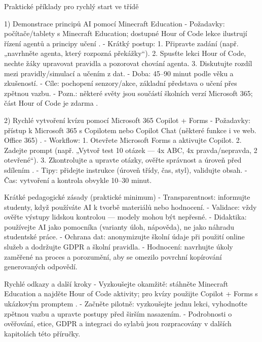 \documentclass{report}%
\begin{document}
Praktické příklady pro rychlý start ve třídě

1) Demonstrace principů AI pomocí Minecraft Education
- Požadavky: počítače/tablety s Minecraft Education; dostupné Hour of Code lekce ilustrují řízení agentů a principy učení \cite{kb_ai_101_tipu_pdf_04e4a115_page_15_2}.
- Krátký postup:
  1. Připravte zadání (např. „navrhněte agenta, který rozpozná překážky“).
  2. Spusťte lekci Hour of Code, nechte žáky upravovat pravidla a pozorovat chování agenta.
  3. Diskutujte rozdíl mezi pravidly/simulací a učením z dat.
- Doba: 45–90 minut podle věku a zkušeností.
- Cíle: pochopení senzory/akce, základní představa o učení přes zpětnou vazbu.
- Pozn.: některé světy jsou součástí školních verzí Microsoft 365; část Hour of Code je zdarma \cite{kb_ai_101_tipu_pdf_04e4a115_page_15_2}.

2) Rychlé vytvoření kvízu pomocí Microsoft 365 Copilot + Forms
- Požadavky: přístup k Microsoft 365 s Copilotem nebo Copilot Chat (některé funkce i ve web. Office 365) \cite{kb_ai_101_tipu_pdf_04e4a115_page_3_1}.
- Workflow:
  1. Otevřete Microsoft Forms a aktivujte Copilot.
  2. Zadejte prompt (např. „Vytvoř test 10 otázek — 4x ABC, 4x pravda/nepravda, 2 otevřené“).
  3. Zkontrolujte a upravte otázky, ověřte správnost a úroveň před sdílením \cite{kb_ai_101_tipu_pdf_04e4a115_page_36_1}.
- Tipy: přidejte instrukce (úroveň třídy, čas, styl), validujte obsah.
- Čas: vytvoření a kontrola obvykle 10–30 minut.

Krátké pedagogické zásady (praktické minimum)
- Transparentnost: informujte studenty, když používáte AI k tvorbě materiálů nebo hodnocení.
- Validace: vždy ověřte výstupy lidskou kontrolou — modely mohou být nepřesné.
- Didaktika: používejte AI jako pomocníka (varianty úloh, nápověda), ne jako náhradu studentské práce.
- Ochrana dat: anonymizujte školní údaje při použití online služeb a dodržujte GDPR a školní pravidla.
- Hodnocení: navrhujte úkoly zaměřené na proces a porozumění, aby se omezilo povrchní kopírování generovaných odpovědí.

Rychlé odkazy a další kroky
- Vyzkoušejte okamžitě: stáhněte Minecraft Education a najděte Hour of Code aktivity; pro kvízy použijte Copilot + Forms s ukázkovým promptem \cite{kb_ai_101_tipu_pdf_04e4a115_page_15_2, kb_ai_101_tipu_pdf_04e4a115_page_36_1}.
- Začněte pilotně: vyzkoušejte jednu lekci, vyhodnoťte zpětnou vazbu a upravte postupy před širším nasazením.
- Podrobnosti o ověřování, etice, GDPR a integraci do sylabů jsou rozpracovány v dalších kapitolách této příručky.%
\end{document}
